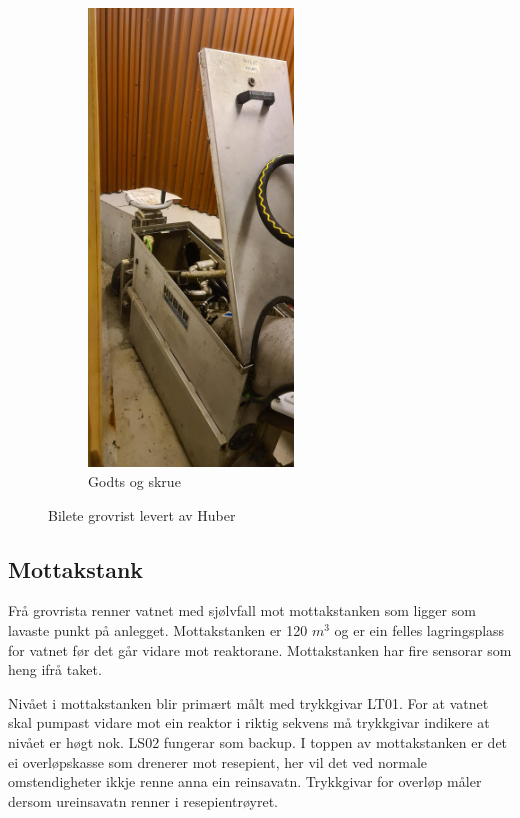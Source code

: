 \begin{figure}[htbp]
\begin{subfigure}[b]{0.3\textwidth}
        \includegraphics[angle=-90,width=0.6\textwidth]{Bilder/Huber2.JPG}
        \caption{Godts og skrue}\label{fig:Huber2}
    \end{subfigure}
    \caption{Bilete grovrist levert av Huber}\label{fig:HuberGrovrist}
\end{figure}

\newpage
\subsection{Mottakstank}
Frå grovrista renner vatnet med sjølvfall mot mottakstanken som ligger som lavaste punkt på anlegget.
Mottakstanken er 120 $m^3$ og er ein felles lagringsplass for vatnet før det går vidare mot reaktorane.
Mottakstanken har fire sensorar som heng ifrå taket.

Nivået i mottakstanken blir primært målt med trykkgivar LT01. For at vatnet skal pumpast vidare mot ein
reaktor i riktig sekvens må trykkgivar indikere at nivået er høgt nok. LS02 fungerar som backup.
I toppen av mottakstanken er det ei overløpskasse som drenerer mot resepient, her vil det
ved normale omstendigheter ikkje renne anna ein reinsavatn. Trykkgivar for overløp måler
dersom ureinsavatn renner i resepientrøyret.

